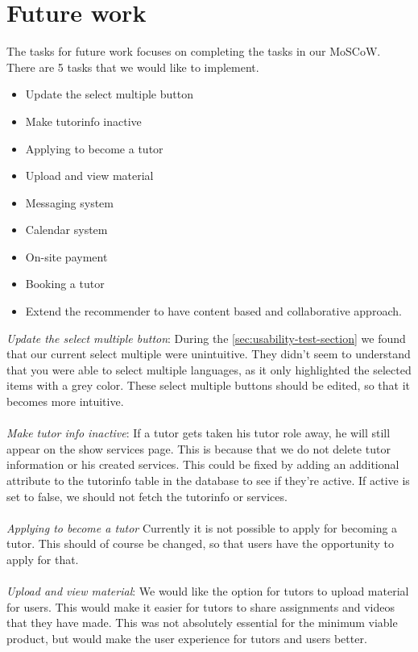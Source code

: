 \section{Future work}
The tasks for future work focuses on completing the tasks in our MoSCoW.
There are 5 tasks that we would like to implement.

\begin{itemize}
    \item Update the select multiple button
    \item Make tutorinfo inactive
    \item Applying to become a tutor
    \item Upload and view material
    \item Messaging system
    \item Calendar system
    \item On-site payment
    \item Booking a tutor
    \item Extend the recommender to have content based and collaborative approach.
\end{itemize}
\noindent
\textit{Update the select multiple button}:
During the \autoref{sec:usability-test-section} we found that our current select multiple were unintuitive. 
They didn't seem to understand that you were able to select multiple languages, as it only highlighted the selected items with a grey color.
These select multiple buttons should be edited, so that it becomes more intuitive.
\\\\
\textit{Make tutor info inactive}:
If a tutor gets taken his tutor role away, he will still appear on the show services page. 
This is because that we do not delete tutor information or his created services.
This could be fixed by adding an additional attribute to the tutorinfo table in the database to see if they're active.
If active is set to false, we should not fetch the tutorinfo or services.
\\\\
\textit{Applying to become a tutor}
Currently it is not possible to apply for becoming a tutor.
This should of course be changed, so that users have the opportunity to apply for that. 
\\\\
\textit{Upload and view material}:
We would like the option for tutors to upload material for users. 
This would make it easier for tutors to share assignments and videos that they have made. 
This was not absolutely essential for the minimum viable product, but would make the user experience for tutors and users better.
